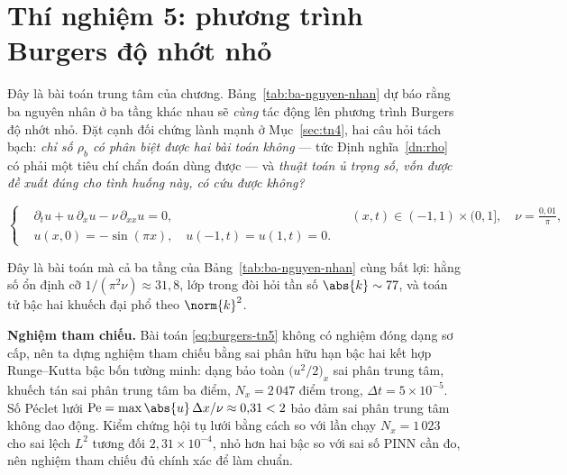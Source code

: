 \section{Thí nghiệm 5: phương trình Burgers độ nhớt nhỏ}
\label{sec:tn5}

\begin{thinghiem}
\label{tn:burgers}
Đây là bài toán trung tâm của chương. Bảng~\ref{tab:ba-nguyen-nhan} dự báo rằng
ba nguyên nhân ở ba tầng khác nhau sẽ \emph{cùng} tác động lên phương trình
Burgers độ nhớt nhỏ. Đặt cạnh đối chứng lành mạnh ở Mục~\ref{sec:tn4}, hai câu
hỏi tách bạch: \emph{chỉ số $\rho_b$ có phân biệt được hai bài toán không} --- tức
Định nghĩa~\ref{dn:rho} có phải một tiêu chí chẩn đoán dùng được --- và
\emph{thuật toán ủ trọng số, vốn được đề xuất đúng cho tình huống này, có cứu
được không?}
\end{thinghiem}

\begin{equation}
\left\{
\begin{aligned}
&\partial_t u + u\,\partial_x u - \nu\,\partial_{xx} u = 0,
  && (x,t) \in (-1,1)\times(0,1], \quad \nu = \tfrac{0{,}01}{\pi},\\
&u(x,0) = -\sin(\pi x), \quad u(-1,t) = u(1,t) = 0.
\end{aligned}
\right.
\label{eq:burgers-tn5}
\end{equation}
 
Đây là bài toán mà cả ba tầng của Bảng~\ref{tab:ba-nguyen-nhan} cùng bất lợi: hằng
số ổn định cỡ $1/(\pi^2\nu) \approx 31{,}8$, lớp trong đòi hỏi tần số
$\abs{k}\sim 77$, và toán tử bậc hai khuếch đại phổ theo $\norm{k}^2$.
 
\textbf{Nghiệm tham chiếu.} Bài toán \eqref{eq:burgers-tn5} không có nghiệm đóng
dạng sơ cấp, nên ta dựng nghiệm tham chiếu bằng sai phân hữu hạn bậc hai kết hợp
Runge--Kutta bậc bốn tường minh: dạng bảo toàn $\big(u^2/2\big)_x$ sai phân trung
tâm, khuếch tán sai phân trung tâm ba điểm, $N_x = 2\,047$ điểm trong,
$\Delta t = 5\times10^{-5}$. Số Péclet lưới
$\mathrm{Pe} = \max\abs{u}\,\Delta x/\nu \approx 0{,}31 < 2$ bảo đảm sai phân
trung tâm không dao động. Kiểm chứng hội tụ lưới bằng cách so với lần chạy
$N_x = 1\,023$ cho sai lệch $L^2$ tương đối $2{,}31\times10^{-4}$, nhỏ hơn hai bậc
so với sai số PINN cần đo, nên nghiệm tham chiếu đủ chính xác để làm chuẩn.
 
